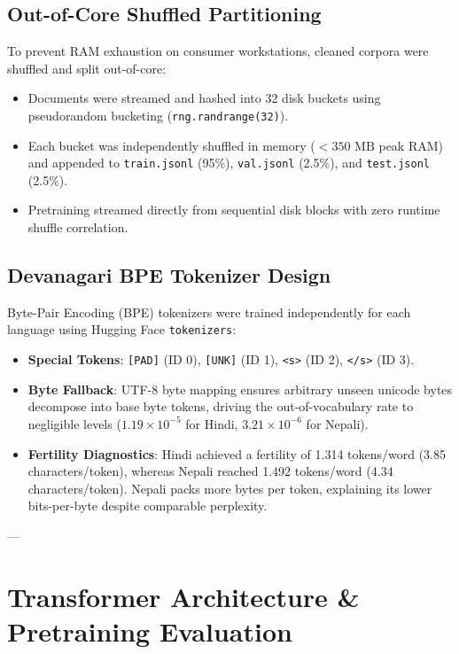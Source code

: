 \documentclass[11pt,a4paper]{article}
\begin{document}
\subsection{Out-of-Core Shuffled Partitioning}
To prevent RAM exhaustion on consumer workstations, cleaned corpora were shuffled and split out-of-core:
\begin{itemize}[noitemsep]
    \item Documents were streamed and hashed into 32 disk buckets using pseudorandom bucketing (\texttt{rng.randrange(32)}).
    \item Each bucket was independently shuffled in memory ($< 350\text{ MB}$ peak RAM) and appended to \texttt{train.jsonl} (95\%), \texttt{val.jsonl} (2.5\%), and \texttt{test.jsonl} (2.5\%).
    \item Pretraining streamed directly from sequential disk blocks with zero runtime shuffle correlation.
\end{itemize}

\subsection{Devanagari BPE Tokenizer Design}
Byte-Pair Encoding (BPE) tokenizers were trained independently for each language using Hugging Face \texttt{tokenizers}:
\begin{itemize}[noitemsep]
    \item \textbf{Special Tokens}: \texttt{[PAD]} (ID 0), \texttt{[UNK]} (ID 1), \texttt{<s>} (ID 2), \texttt{</s>} (ID 3).
    \item \textbf{Byte Fallback}: UTF-8 byte mapping ensures arbitrary unseen unicode bytes decompose into base byte tokens, driving the out-of-vocabulary rate to negligible levels ($1.19 \times 10^{-5}$ for Hindi, $3.21 \times 10^{-6}$ for Nepali).
    \item \textbf{Fertility Diagnostics}: Hindi achieved a fertility of 1.314 tokens/word (3.85 characters/token), whereas Nepali reached 1.492 tokens/word (4.34 characters/token). Nepali packs more bytes per token, explaining its lower bits-per-byte despite comparable perplexity.
\end{itemize}

---

\section{Transformer Architecture \& Pretraining Evaluation}
\end{document}
